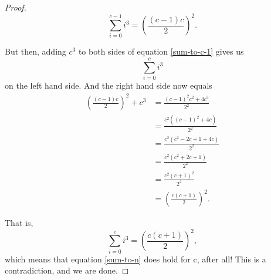 \documentclass[twoside,12pt]{article}
\begin{document}
\begin{problem}{15}
{\begin{proof}
\begin{equation}\label{sum-to-c-1}
\sum_{i=0}^{c-1} i^3 = \left(\frac{(c-1)c}{2}\right)^2.
\end{equation}

But then, adding $c^3$ to both sides of equation \eqref{sum-to-c-1} gives us
\[
\sum_{i=0}^{c} i^3
\]
on the left hand side. And the right hand side now equals
\begin{align*}
\left(\frac{(c-1)c}{2}\right)^2 + c^3 &= \frac{(c-1)^2c^2+4c^3}{2^2}\\
 &= \frac{c^2\left((c-1)^2+4c \right)}{2^2}\\
&= \frac{c^2\left(c^2-2c+1+4c \right)}{2^2}\\
&= \frac{c^2\left(c^2+2c+1 \right)}{2^2}\\
&= \frac{c^2(c+1)^2}{2^2}\\
&= \left(\frac{c(c+1)}{2}\right)^2.
\end{align*}

That is,
\[
\sum_{i=0}^{c} i^3 = \left(\frac{c(c+1)}{2}\right)^2,
\]
which means that equation \ref{sum-to-n} does hold for c, after all! This is a contradiction, and we are done.

\end{proof}
}

\end{problem}
\end{document}
